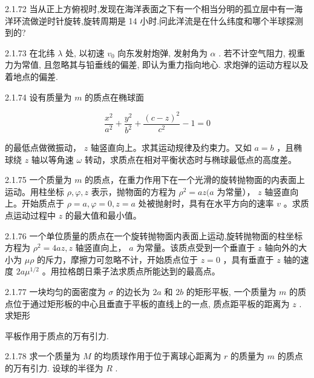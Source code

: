 \begin{problem}{2.1.72}
当从正上方俯视时,发现在海洋表面之下有一个相当分明的孤立层中有一海洋环流做逆时针旋转,旋转周期是 14 小时.问此洋流是在什么纬度和哪个半球探测到的?
\end{problem}
\clearpage


\begin{problem}{2.1.73}
在北纬 $\lambda$ 处, 以初速 $v_{0}$ 向东发射炮弹, 发射角为 $\alpha$ . 若不计空气阻力, 视重力为常值, 且忽略其与铅垂线的偏差, 即认为重力指向地心. 求炮弹的运动方程以及着地点的偏差.
\end{problem}
\clearpage


\begin{problem}{2.1.74}
设有质量为 $m$ 的质点在椭球面

\[
\frac {x ^ {2}}{a ^ {2}} + \frac {y ^ {2}}{b ^ {2}} + \frac {(c - z) ^ {2}}{c ^ {2}} - 1 = 0
\]

的最低点做微振动， $z$ 轴竖直向上。求其运动规律及约束力。又如 $a = b$ ，且椭球绕 $z$ 轴以等角速 $\omega$ 转动，求质点在相对平衡状态时与椭球最低点的高度差。
\end{problem}
\clearpage


\begin{problem}{2.1.75}
一个质量为 $m$ 的质点，在重力作用下在一个光滑的旋转抛物面的内表面上运动。用柱坐标 $\rho, \varphi, z$ 表示，抛物面的方程为 $\rho^2 = az(a$ 为常量）， $z$ 轴竖直向上。开始质点于 $\rho = a, \varphi = 0, z = a$ 处被抛射时，具有在水平方向的速率 $v$ 。求质点运动过程中 $z$ 的最大值和最小值。
\end{problem}
\clearpage


\begin{problem}{2.1.76}
一个单位质量的质点在一个旋转抛物面内表面上运动,旋转抛物面的柱坐标方程为 $\rho^2 = 4az, z$ 轴竖直向上， $a$ 为常量。该质点受到一个垂直于 $z$ 轴向外的大小为 $\mu \rho$ 的斥力，摩擦力可忽略不计，开始质点位于 $z = 0$ ，具有垂直于 $z$ 轴的速度 $2a\mu^{1/2}$ 。用拉格朗日乘子法求质点所能达到的最高点。
\end{problem}
\clearpage


\begin{problem}{2.1.77}
一块均匀的面密度为 $\sigma$ 的边长为 $2a$ 和 $2b$ 的矩形平板, 一个质量为 $m$ 的质点位于通过矩形板的中心且垂直于平板的直线上的一点, 质点距平板的距离为 $z$ . 求矩形

平板作用于质点的万有引力.
\end{problem}
\clearpage


\begin{problem}{2.1.78}
求一个质量为 $M$ 的均质球作用于位于离球心距离为 $r$ 的质量为 $m$ 的质点的万有引力. 设球的半径为 $R$ .
\end{problem}
\clearpage


